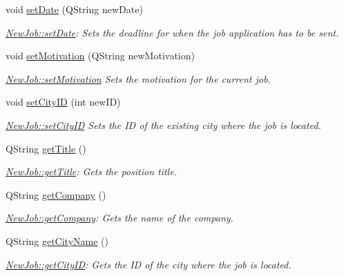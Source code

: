 \begin{DoxyCompactItemize}
void \mbox{\hyperlink{class_new_job_a0a1d9067e72f797ad3b1f01d44fedb0f}{set\+Date}} (Q\+String new\+Date)
\begin{DoxyCompactList}\small\item\em \mbox{\hyperlink{class_new_job_a0a1d9067e72f797ad3b1f01d44fedb0f}{New\+Job\+::set\+Date}}\+: Sets the deadline for when the job application has to be sent. \end{DoxyCompactList}\item 
void \mbox{\hyperlink{class_new_job_a3ddb9ee8bccdf069711406effb9d7dcd}{set\+Motivation}} (Q\+String new\+Motivation)
\begin{DoxyCompactList}\small\item\em \mbox{\hyperlink{class_new_job_a3ddb9ee8bccdf069711406effb9d7dcd}{New\+Job\+::set\+Motivation}} Sets the motivation for the current job. \end{DoxyCompactList}\item 
void \mbox{\hyperlink{class_new_job_ab5b021c928c289b77b726cc418d194de}{set\+City\+ID}} (int new\+ID)
\begin{DoxyCompactList}\small\item\em \mbox{\hyperlink{class_new_job_ab5b021c928c289b77b726cc418d194de}{New\+Job\+::set\+City\+ID}} Sets the ID of the existing city where the job is located. \end{DoxyCompactList}\item 
Q\+String \mbox{\hyperlink{class_new_job_aa93c07712d80644b828994a01993c27c}{get\+Title}} ()
\begin{DoxyCompactList}\small\item\em \mbox{\hyperlink{class_new_job_aa93c07712d80644b828994a01993c27c}{New\+Job\+::get\+Title}}\+: Gets the position title. \end{DoxyCompactList}\item 
Q\+String \mbox{\hyperlink{class_new_job_ad4680ae9c009b90ce751c3c5fe60cdb5}{get\+Company}} ()
\begin{DoxyCompactList}\small\item\em \mbox{\hyperlink{class_new_job_ad4680ae9c009b90ce751c3c5fe60cdb5}{New\+Job\+::get\+Company}}\+: Gets the name of the company. \end{DoxyCompactList}\item 
Q\+String \mbox{\hyperlink{class_new_job_a0b1679fdb58a6c4d72d935595ba4e835}{get\+City\+Name}} ()
\begin{DoxyCompactList}\small\item\em \mbox{\hyperlink{class_new_job_aed4a9a6fa7eab69062c1d36afd58cd75}{New\+Job\+::get\+City\+ID}}\+: Gets the ID of the city where the job is located. \end{DoxyCompactList}\item 

\end{DoxyCompactItemize}
